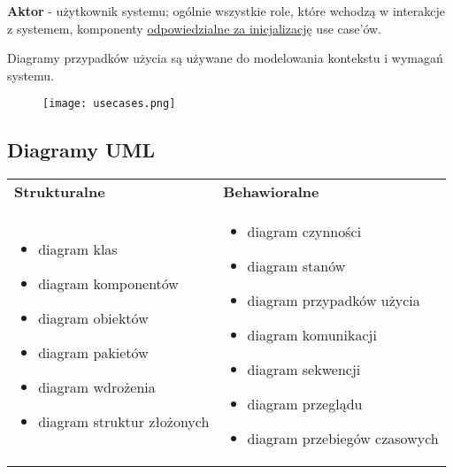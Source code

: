 \documentclass[../main.tex]{subfiles}
\begin{document}
    \textbf{Aktor} - użytkownik systemu; ogólnie wszystkie role, które wchodzą w interakcje z systemem, komponenty \underline{odpowiedzialne
    za inicjalizację} use case'ów.

    Diagramy przypadków użycia są używane do modelowania kontekstu i wymagań systemu.

    \begin{figure}[H]
        \texttt{[image: usecases.png]}
    \end{figure}


    \subsection{Diagramy UML}
    \begin{table}[H]
        \begin{center}
            \begin{tabular}{  p{8cm} p{8cm} }
                \toprule
                \textbf{Strukturalne} & \textbf{Behawioralne}\\

                \cmidrule(r){1-1}\cmidrule(r){2-2}

                \begin{itemize}
                    \item diagram klas
                    \item diagram komponentów
                    \item diagram obiektów
                    \item diagram pakietów
                    \item diagram wdrożenia
                    \item diagram struktur złożonych
                \end{itemize}
                &
                \begin{itemize}
                    \item diagram czynności
                    \item diagram stanów
                    \item diagram przypadków użycia
                    \item diagram komunikacji
                    \item diagram sekwencji
                    \item diagram przeglądu
                    \item diagram przebiegów czasowych
                \end{itemize}
                \\

                \bottomrule
            \end{tabular}
        \end{center}
    \end{table}
\end{document}
